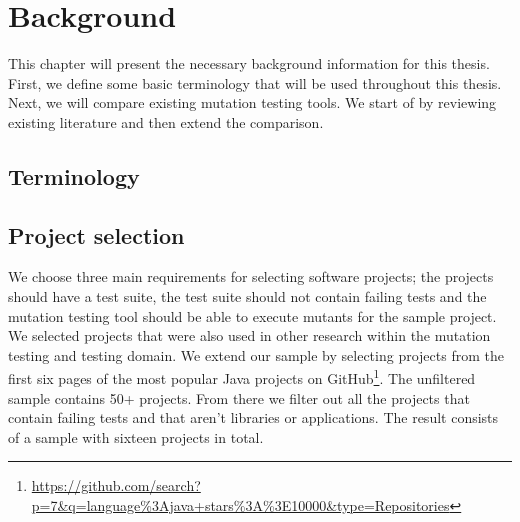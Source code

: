 \documentclass[../main]{subfiles}
\begin{document}
\chapter{Background}
\label{ch:background}
This chapter will present the necessary background information for this thesis. First, we define some basic terminology that will be used throughout this thesis.
Next, we will compare existing mutation testing tools. We start of by reviewing existing literature and then extend the comparison. 
\section{Terminology}
\section{Project selection}
We choose three main requirements for selecting software projects; the projects should have a test suite, the test suite should not contain failing tests and the mutation testing tool should be able to execute mutants for the sample project.
We selected projects that were also used in other research within the mutation testing and testing domain\cite{Pizzoleto2019,Yu2019PossibilityScope,Wei2021SpectralTesting, Zhang2019PredictiveTesting, Chen2018SpeedingStudy, Laurent2017AssessingPIT}.
We extend our sample by selecting projects from the first six pages of the most popular Java projects on GitHub\footnote{\url{https://github.com/search?p=7&q=language\%3Ajava+stars\%3A\%3E10000&type=Repositories}}.
The unfiltered sample contains 50+ projects.
From there we filter out all the projects that contain failing tests and that aren't libraries or applications.
The result consists of a sample with sixteen projects in total.
\end{document}
